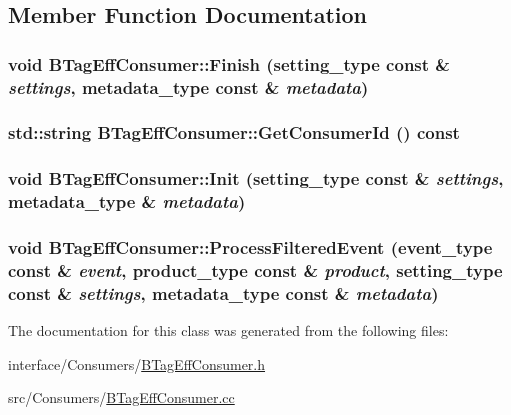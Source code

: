 \subsection{Member Function Documentation}
\hypertarget{classBTagEffConsumer_ab6c08026612b755cfc280c80e74b2fcf}{
\subsubsection[{Finish}]{\setlength{\rightskip}{0pt plus 5cm}void BTagEffConsumer::Finish (setting\_\-type const \& {\em settings}, \/  metadata\_\-type const \& {\em metadata})}}
\label{classBTagEffConsumer_ab6c08026612b755cfc280c80e74b2fcf}
\hypertarget{classBTagEffConsumer_aed32021cd9770c3d476e402d79255696}{
\subsubsection[{GetConsumerId}]{\setlength{\rightskip}{0pt plus 5cm}std::string BTagEffConsumer::GetConsumerId () const}}
\label{classBTagEffConsumer_aed32021cd9770c3d476e402d79255696}
\hypertarget{classBTagEffConsumer_af3b5e34c1c6fe81ca9da43b2c3a202e7}{
\subsubsection[{Init}]{\setlength{\rightskip}{0pt plus 5cm}void BTagEffConsumer::Init (setting\_\-type const \& {\em settings}, \/  metadata\_\-type \& {\em metadata})}}
\label{classBTagEffConsumer_af3b5e34c1c6fe81ca9da43b2c3a202e7}
\hypertarget{classBTagEffConsumer_a000e908dedb6295a01011da52ecf178e}{
\subsubsection[{ProcessFilteredEvent}]{\setlength{\rightskip}{0pt plus 5cm}void BTagEffConsumer::ProcessFilteredEvent (event\_\-type const \& {\em event}, \/  product\_\-type const \& {\em product}, \/  setting\_\-type const \& {\em settings}, \/  metadata\_\-type const \& {\em metadata})}}
\label{classBTagEffConsumer_a000e908dedb6295a01011da52ecf178e}


The documentation for this class was generated from the following files:\begin{DoxyCompactItemize}
\item 
interface/Consumers/\hyperlink{BTagEffConsumer_8h}{BTagEffConsumer.h}\item 
src/Consumers/\hyperlink{BTagEffConsumer_8cc}{BTagEffConsumer.cc}\end{DoxyCompactItemize}
